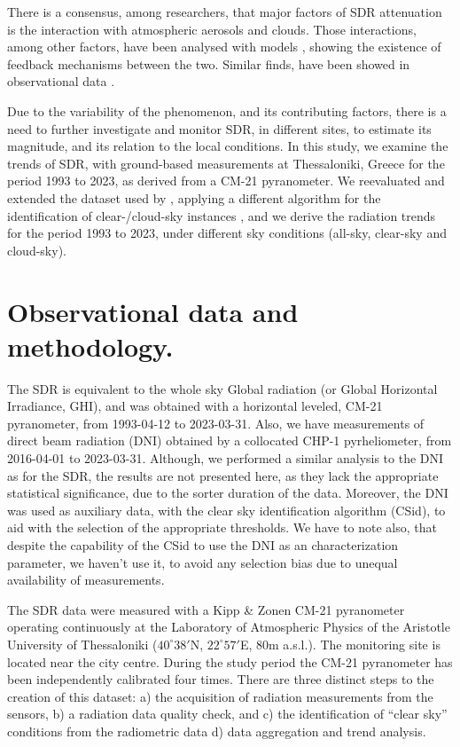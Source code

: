 \documentclass[preprint, 3p,
authoryear]{elsarticle} %
\begin{document}
There is a consensus, among researchers, that major factors of SDR
attenuation is the interaction with atmospheric aerosols and clouds.
Those interactions, among other factors, have been analysed with models
\citep{Li2016, Samset2018}, showing the existence of feedback mechanisms
between the two. Similar finds, have been showed in observational data
\citep[ and references
therein]{Schwarz2020, Ohvril2009, Zerefos2009, Xia2007}.

Due to the variability of the phenomenon, and its contributing factors,
there is a need to further investigate and monitor SDR, in different
sites, to estimate its magnitude, and its relation to the local
conditions. In this study, we examine the trends of SDR, with
ground-based measurements at Thessaloniki, Greece for the period 1993 to
2023, as derived from a CM-21 pyranometer. We reevaluated and extended
the dataset used by \citet{Bais2013}, applying a different algorithm for
the identification of clear-/cloud-sky instances
\citep{Reno2016, Reno2012a}, and we derive the radiation trends for the
period 1993 to 2023, under different sky conditions (all-sky, clear-sky
and cloud-sky).

\hypertarget{observational-data-and-methodology.}{%
\section{Observational data and
methodology.}\label{observational-data-and-methodology.}}

The SDR is equivalent to the whole sky Global radiation (or Global
Horizontal Irradiance, GHI), and was obtained with a horizontal leveled,
CM-21 pyranometer, from 1993-04-12 to 2023-03-31. Also, we have
measurements of direct beam radiation (DNI) obtained by a collocated
CHP-1 pyrheliometer, from 2016-04-01 to 2023-03-31. Although, we
performed a similar analysis to the DNI as for the SDR, the results are
not presented here, as they lack the appropriate statistical
significance, due to the sorter duration of the data. Moreover, the DNI
was used as auxiliary data, with the clear sky identification algorithm
(CSid), to aid with the selection of the appropriate thresholds. We have
to note also, that despite the capability of the CSid to use the DNI as
an characterization parameter, we haven't use it, to avoid any selection
bias due to unequal availability of measurements.

The SDR data were measured with a Kipp \& Zonen CM-21 pyranometer
operating continuously at the Laboratory of Atmospheric Physics of the
Aristotle University of Thessaloniki (\(40^\circ38'\)N,
\(22^\circ57'\)E, 80m a.s.l.). The monitoring site is located near the
city centre. During the study period the CM-21 pyranometer has been
independently calibrated four times. There are three distinct steps to
the creation of this dataset: a) the acquisition of radiation
measurements from the sensors, b) a radiation data quality check, and c)
the identification of ``clear sky'' conditions from the radiometric data
d) data aggregation and trend analysis.
\end{document}
